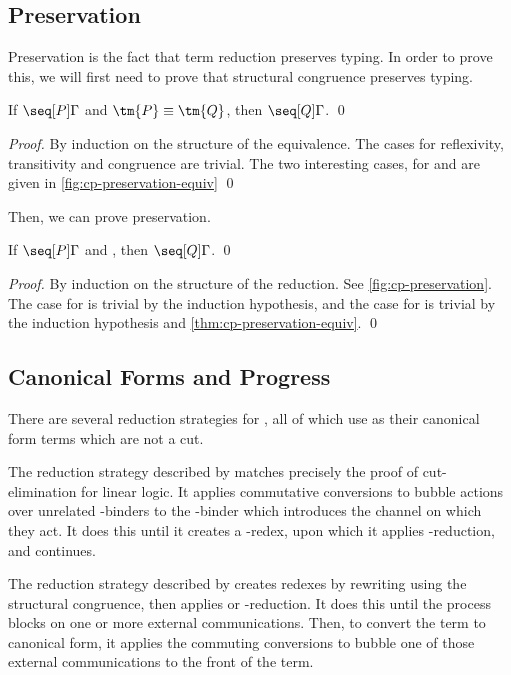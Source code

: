 \documentclass[UKenglish]{llncs}
\begin{document}
\subsection{Preservation}
Preservation is the fact that term reduction preserves typing. In order to prove
this, we will first need to prove that structural congruence preserves typing.
\begin{theorem}\label{thm:cp-preservation-equiv}
  If $\seq[{ P }]{ \Gamma }$ and $\tm{P} \equiv \tm{Q}$,
  then $\seq[{ Q }]{\Gamma }$.
  \qed
\end{theorem}
\begin{proof}
  By induction on the structure of the equivalence. The cases for reflexivity,
  transitivity and congruence are trivial. The two interesting cases, for
  \cpEquivCutComm and  are given in \cref{fig:cp-preservation-equiv}
  \qed
\end{proof}
Then, we can prove preservation.
\begin{theorem}[Preservation]\label{thm:cp-preservation}
  If $\seq[{ P }]{ \Gamma }$ and ,
  then $\seq[{ Q }]{ \Gamma }$.
  \qed
\end{theorem}
\begin{proof}
  By induction on the structure of the reduction.
  See \cref{fig:cp-preservation}.
  The case for \cpRedGammaCut is trivial by the induction hypothesis, and the
  case for \cpRedGammaEquiv is trivial by the induction hypothesis and
  \cref{thm:cp-preservation-equiv}.
  \qed
\end{proof}




\subsection{Canonical Forms and Progress}
There are several reduction strategies for \cp, all of which use as their
canonical form terms which are not a cut.

The reduction strategy described by  matches precisely the
proof of cut-elimination for linear logic. It applies commutative conversions to
bubble actions over unrelated \textnu-binders to the \textnu-binder which
introduces the channel on which they act. It does this until it creates a
\textbeta-redex, upon which it applies \textbeta-reduction, and continues.

The reduction strategy described by \citeauthor{lindley2015semantics} creates
redexes by rewriting using the structural congruence, then applies
 or \textbeta-reduction. It does this until the process blocks on
one or more external communications. Then, to convert the term to canonical
form, it applies the commuting conversions to bubble one of those external
communications to the front of the term.
\end{document}
